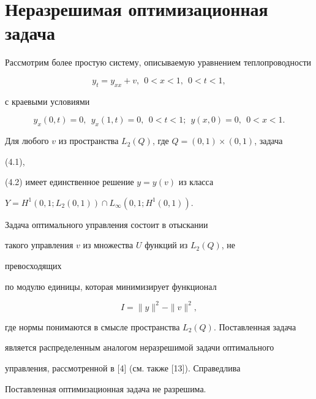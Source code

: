 \section{Неразрешимая оптимизационная задача} 


 


Рассмотрим более простую систему, описываемую уравнением теплопроводности 


\begin{equation} 


y_t=y_{xx}+v,\ \ 0<x<1,\ \ 0<t<1, 


\end{equation} 


с краевыми условиями 


\begin{equation} 


y_x(0,t)=0,\ \ y_x(1,t)=0,\ \ 0<t<1;\ \ y(x,0)=0,\ \ 0<x<1. 


\end{equation} 


Для любого $v$ из пространства $L_2(Q)$, где $Q=(0,1)\times(0,1)$, задача 


(4.1), 


(4.2) имеет единственное решение $y=y(v)$ из класса 


$Y=H^1(0,1;L_2(0,1))\cap L_\infty(0,1;H^1(0,1))$. 


Задача оптимального управления состоит в отыскании 


такого управления $v$ из множества $U$ функций из $L_2(Q)$, не 


превосходящих 


по модулю единицы, которая минимизирует функционал 


$$ 


I=\|y\|^2-\|v\|^2, 


$$ 


где нормы понимаются в смысле пространства $L_2(Q)$. Поставленная задача 


является распределенным аналогом неразрешимой задачи оптимального 


управления, рассмотренной в [4] (см. также [13]). Справедлива 


 


\begin{thm} 


Поставленная оптимизационная задача не разрешима. 


\end{thm} 


